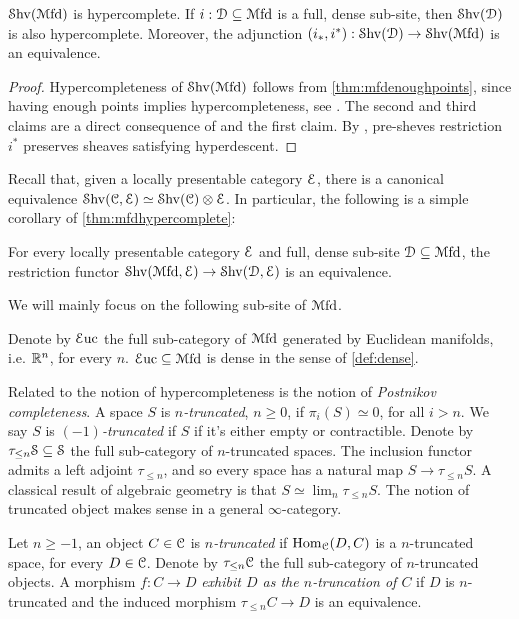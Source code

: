 \documentclass[10pt]{amsart}
\begin{document}
\begin{theorem}\label{thm:mfdhypercomplete}
	$\mathcal{S}\mathrm{hv}(\mathcal{M}\mathrm{fd})$ is hypercomplete. If $i:\mathcal{D}\subseteq\mathcal{M}\mathrm{fd}$ is a full, dense sub-site, then $\mathcal{S}\mathrm{hv}(\mathcal{D})$ is also hypercomplete. Moreover, the adjunction $(i_*,i^*):\mathcal{S}\mathrm{hv}(\mathcal{D})\to\mathcal{S}\mathrm{hv}(\mathcal{M}\mathrm{fd})$ is an equivalence.
\end{theorem}
\begin{proof}
	Hypercompleteness of $\mathcal{S}\mathrm{hv}(\mathcal{M}\mathrm{fd})$ follows from \cref{thm:mfdenoughpoints}, since having enough points implies hypercompleteness, see \cite[Example 3.11.10]{barwick2020exodromy}. The second and third claims are a direct consequence of \cite[Corollary 3.12.13]{barwick2020exodromy} and the first claim. By \cite[Proposition 3.12.11]{barwick2020exodromy}, pre-sheves restriction $i^*$ preserves sheaves satisfying hyperdescent. 
\end{proof}Recall that, given a locally presentable category $\mathcal{E}$, there is a canonical equivalence $\mathcal{S}\mathrm{hv}(\mathcal{C},\mathcal{E})\simeq\mathcal{S}\mathrm{hv}(\mathcal{C})\otimes\mathcal{E}$. In particular, the following is a simple corollary of \cref{thm:mfdhypercomplete}:
\begin{corollary}\label{cor:equivalence}
For every locally presentable category $\mathcal{E}$ and full, dense sub-site $\mathcal{D}\subseteq\mathcal{M}\mathrm{fd}$, the restriction functor $\mathcal{S}\mathrm{hv}(\mathcal{M}\mathrm{fd},\mathcal{E})\to\mathcal{S}\mathrm{hv}(\mathcal{D},\mathcal{E})$ is an equivalence. 	
\end{corollary}
We will mainly focus on the following sub-site of $\mathcal{M}\mathrm{fd}$.
\begin{definition}
	Denote by $\mathcal{E}\mathrm{uc}$ the full sub-category of $\mathcal{M}\mathrm{fd}$ generated by Euclidean manifolds, i.e. $\mathbb{R}^n$, for every $n$. $\mathcal{E}\mathrm{uc}\subseteq\mathcal{M}\mathrm{fd}$ is dense in the sense of \cref{def:dense}. 
\end{definition}
Related to the notion of hypercompleteness is the notion of \emph{Postnikov completeness}. A space $S$ is \emph{$n$-truncated}, $n\geq0$, if $\pi_i(S)\simeq0$, for all $i>n$. We say $S$ is \emph{$(-1)$-truncated} if $S$ if it's either empty or contractible. Denote by $\tau_{\leq n}\mathcal{S}\subseteq\mathcal{S}$ the full sub-category of $n$-truncated spaces. The inclusion functor admits a left adjoint $\tau_{\leq n}$, and so every space has a natural map $S\to\tau_{\leq n}S$. A classical result of algebraic geometry is that $S\simeq\lim_n\tau_{\leq n}S$. The notion of truncated object makes sense in a general $\infty$-category. 
\begin{definition}
	Let $n\geq-1$, an object $C\in\mathcal{C}$ is $n$\emph{-truncated} if $\mathrm{Hom}_{\mathcal{C}}(D,C)$ is a $n$-truncated space, for every $D\in\mathcal{C}$. Denote by $\tau_{\leq n}\mathcal{C}$ the full sub-category of $n$-truncated objects. A morphism $f:C\to D$ \emph{exhibit $D$ as the $n$-truncation of $C$} if $D$ is $n$-truncated and the induced morphism $\tau_{\leq n}C\to D$ is an equivalence. 
\end{definition}
\end{document}
